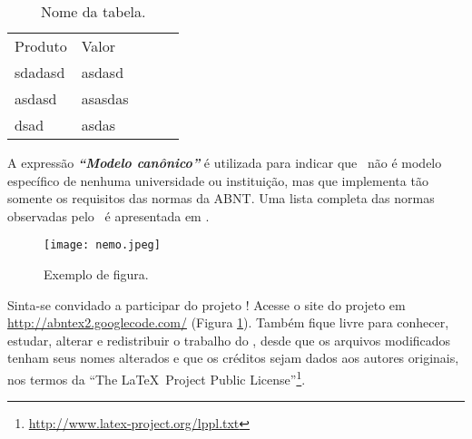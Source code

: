 \documentclass[
	12pt,				%
    oneside,			%
	a4paper,			%
	english,			%
	french,				%
	spanish,			%
	brazil,				%
	]{abntex2}
\begin{document}
\begin{table}[hbt] %
\begin{center}
\caption{Nome da tabela.} %
\begin{tabular}{|l|l|lll}
\cline{1-2}
Produto & Valor   &  &  &  \\ \cline{1-2}\cline{1-2}
sdadasd & asdasd  &  &  &  \\ \cline{1-2}
asdasd  & asasdas &  &  &  \\ \cline{1-2}
dsad    & asdas   &  &  &  \\ \cline{1-2}
\end{tabular}
\end{center}
\end{table}

A expressão \textit{\textbf{``Modelo canônico''}} é utilizada para indicar que \abnTeX\ não é
modelo específico de nenhuma universidade ou instituição, mas que implementa tão
somente os requisitos das normas da ABNT. Uma lista completa das normas
observadas pelo \abnTeX\ é apresentada em . %

\begin{figure} [hbt] 
\label{figura1} 
\caption{Exemplo de figura.}
\texttt{[image: nemo.jpeg]} %
\end{figure}


Sinta-se convidado a participar do projeto \abnTeX! Acesse o site do projeto em
\url{http://abntex2.googlecode.com/} (Figura \ref{figura1}). Também fique livre para conhecer,
estudar, alterar e redistribuir o trabalho do \abnTeX, desde que os arquivos
modificados tenham seus nomes alterados e que os créditos sejam dados aos
autores originais, nos termos da ``The \LaTeX\ Project Public
License''\footnote{\url{http://www.latex-project.org/lppl.txt}}.
\end{document}
